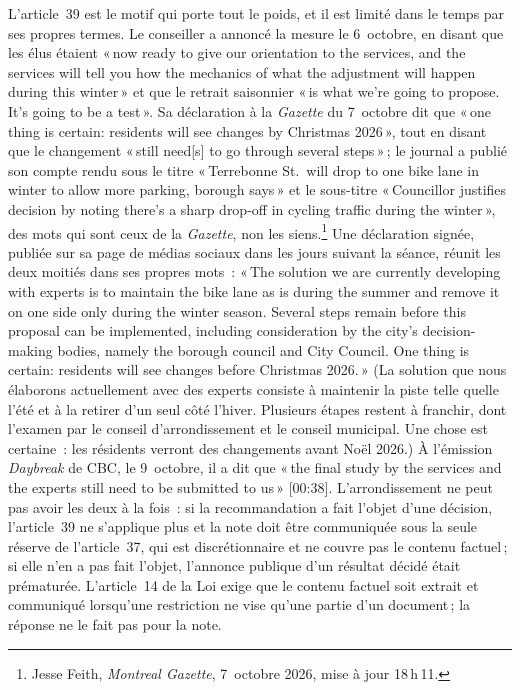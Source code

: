 \documentclass[11pt,letterpaper]{article}
\begin{document}
L'article~39 est le motif qui porte tout le poids, et il est limité dans le
temps par ses propres termes. Le conseiller a annoncé la mesure le
6~octobre, en disant que les élus étaient «\,now ready to give our
orientation to the services, and the services will tell you how the
mechanics of what the adjustment will happen during this winter\,» et que
le retrait saisonnier «\,is what we're going to propose. It's going to be a
test\,». Sa déclaration à la \emph{Gazette} du 7~octobre dit que «\,one
thing is certain: residents will see changes by Christmas 2026\,», tout en
disant que le changement «\,still need[s] to go through several steps\,»\,;
le journal a publié son compte rendu sous le titre «\,Terrebonne St.\ will
drop to one bike lane in winter to allow more parking, borough says\,» et
le sous-titre «\,Councillor justifies decision by noting there's a sharp
drop-off in cycling traffic during the winter\,», des mots qui sont ceux de
la \emph{Gazette}, non les siens.\footnote{Jesse Feith, \emph{Montreal
Gazette}, 7~octobre 2026, mise à jour 18\,h\,11.} Une
déclaration signée, publiée sur sa page de médias sociaux dans les jours
suivant la séance, réunit les deux moitiés dans ses propres mots~:
«\,The solution we are currently developing with experts is to maintain the
bike lane as is during the summer and remove it on one side only during the
winter season. Several steps remain before this proposal can be
implemented, including consideration by the city's decision-making bodies,
namely the borough council and City Council. One thing is certain:
residents will see changes before Christmas 2026.\,» (La solution que nous
élaborons actuellement avec des experts consiste à maintenir la piste telle
quelle l'été et à la retirer d'un seul côté l'hiver. Plusieurs étapes
restent à franchir, dont l'examen par le conseil d'arrondissement et le
conseil municipal. Une chose est certaine~: les résidents verront des
changements avant Noël 2026.) À l'émission \emph{Daybreak} de CBC, le
9~octobre, il a dit que «\,the final study by the services and the experts
still need to be submitted to us\,» [00:38].
L'arrondissement ne peut pas avoir les deux à la fois~: si la recommandation
a fait l'objet d'une décision, l'article~39 ne s'applique plus et la note
doit être communiquée sous la seule réserve de l'article~37, qui est
discrétionnaire et ne couvre pas le contenu factuel\,; si elle n'en a pas
fait l'objet, l'annonce publique d'un résultat décidé était prématurée.
L'article~14 de la Loi exige que le contenu factuel soit extrait et
communiqué lorsqu'une restriction ne vise qu'une partie d'un document\,; la
réponse ne le fait pas pour la note.
\end{document}
